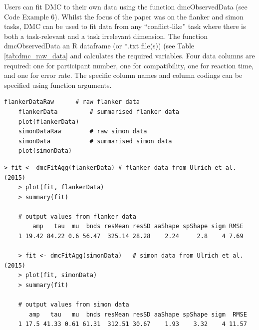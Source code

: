 Users can fit DMC to their own data using the function dmcObservedData (see
Code Example 6). Whilst the focus of the \textcite{ulrich2015automatic} paper
was on the flanker and simon tasks, DMC can be used to fit data from any
``conflict-like'' task where there is both a task-relevant and a task
irrelevant dimension. The function dmcObservedData an R dataframe (or *.txt
file(s)) (see Table \ref{tab:dmc_raw_data} and calculates the required
variables. Four data columns are required: one for participant number, one for
compatibility, one for reaction time, and one for error rate. The specific
column names and column codings can be specified using function arguments.

\begin{minipage}{\linewidth}
    \begin{lstlisting}[style = R, title = {
        R Code Example 4: The package contains the data from
        \textcite{ulrich2015automatic}. A figure of the summarized data can be
        produced by calling \textit{plot} with the observed data as an input
        argument.
        }, captionpos = t]
    flankerDataRaw      # raw flanker data
    flankerData         # summarised flanker data
    plot(flankerData)
    simonDataRaw        # raw simon data
    simonData           # summarised simon data
    plot(simonData)
        \end{lstlisting}
    \end{minipage}

\begin{minipage}{\linewidth}
    \begin{lstlisting}[style = R, title = {
    R Code Example 5: The example data from \textcite{ulrich2015automatic} can
    be fitted using the function \textit{dmcFitAgg}. This fits DMC to the
    aggregated data.  A call to \textit{plot} with the output of fit as the
    first input argument and the observed data as the second input argument
    will plot the predicted values from the model fit against the observed
    values from the data (see Figures \ref{fig:5} and \ref{fig:6})
    }, captionpos = t]
    > fit <- dmcFitAgg(flankerData) # flanker data from Ulrich et al. (2015)
    > plot(fit, flankerData)
    > summary(fit)
    
    # output values from flanker data
        amp   tau  mu  bnds resMean resSD aaShape spShape sigm RMSE
    1 19.42 84.22 0.6 56.47  325.14 28.28    2.24     2.8    4 7.69
    
    > fit <- dmcFitAgg(simonData)   # simon data from Ulrich et al. (2015)
    > plot(fit, simonData)
    > summary(fit)
    
    # output values from simon data
       amp   tau   mu  bnds resMean resSD aaShape spShape sigm  RMSE
    1 17.5 41.33 0.61 61.31  312.51 30.67    1.93    3.32    4 11.57
    \end{lstlisting}
\end{minipage}



